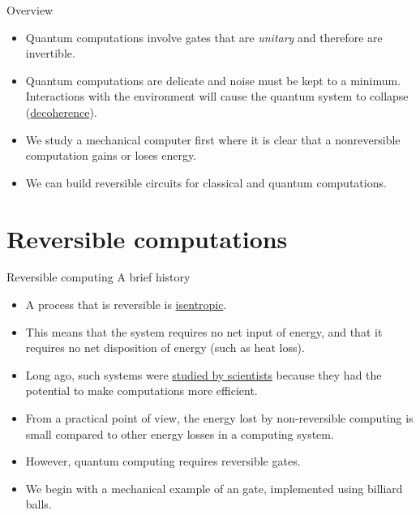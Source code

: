 
\begin{frame}{Overview}
\begin{itemize}
    \item Quantum computations involve gates that are \emph{unitary} and therefore are invertible.
    \item Quantum computations are delicate and noise must be kept to a minimum.  Interactions with the environment will cause the quantum system to collapse (\href{https://en.wikipedia.org/wiki/Quantum_decoherence}{decoherence}).
    \item We study a mechanical computer first where it is clear that a nonreversible computation gains or loses energy.
    \item We can build reversible circuits for classical and quantum computations.
    
\end{itemize}
\end{frame}

\section*{Reversible computations}

\begin{frame}{Reversible computing }{A brief history}
\begin{itemize}[<+->]
    \item A process that is reversible is \href{https://en.wikipedia.org/wiki/Isentropic_process}{isentropic}.
    \item This means that the system requires no net input of energy, and that it requires no net disposition of energy (such as heat loss).
    \item Long ago, such systems were \href{https://en.wikipedia.org/wiki/Charles_H._Bennett_(physicist)}{studied by scientists} because they had the potential to make computations more efficient.
    \item From a practical point of view, the energy lost by non-reversible computing is small compared to other energy losses in a computing system.
    \item However, quantum computing requires reversible gates.
    \item We begin with a mechanical example of an  gate, implemented using billiard balls.
\end{itemize}
\end{frame}


